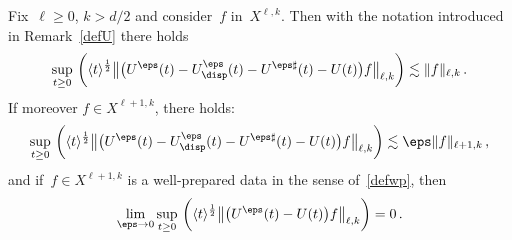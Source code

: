 \begin{lemm}\label{lem:UepstoU0}
Fix~$\ell \ge0$, ${k>d/2}$ and consider~{$f$ in~$X^{\ell,k}$}. Then with the notation introduced in Remark~\ref{defU} there holds
\begin{equation}\label{boundUeps-U0ip}
\sup_{t \ge 0} \, \bigg(\langle t \rangle^{\frac12} \big\| \big(U^\eps (t) - U^\eps_{\disp}(t) - U^{\eps \sharp}(t)- U (t)\big) {f} \big \|_{\ell,k}\bigg) \lesssim \|f\|_{\ell,k} \,.
\end{equation}
If moreover $f \in X^{\ell+1,k}$, there holds:
\begin{equation}\label{estimatesmoothdata}
\sup_{t \ge 0} \, \bigg(\langle t \rangle^{\frac12} \big\| \big(U^\eps (t) - U^\eps_{\disp}(t) - U^{\eps \sharp}(t)- U (t)\big) {f} \big \|_{\ell,k}\bigg) \lesssim \eps \|f\|_{\ell+1,k} \,,
\end{equation}
and if~{$f \in X^{\ell+1,k}$} is a well-prepared data in the sense of~\eqref{defwp}, then
\begin{equation}\label{boundUeps-U0}
\lim_{\eps\to0}\sup_{t \ge 0} \, \bigg(\langle t \rangle^{\frac12} \big \| \big(U^\eps (t) - U (t)\big) {f} \big\|_{{\ell,k}} \bigg)= 0\,.
\end{equation}
\end{lemm}
